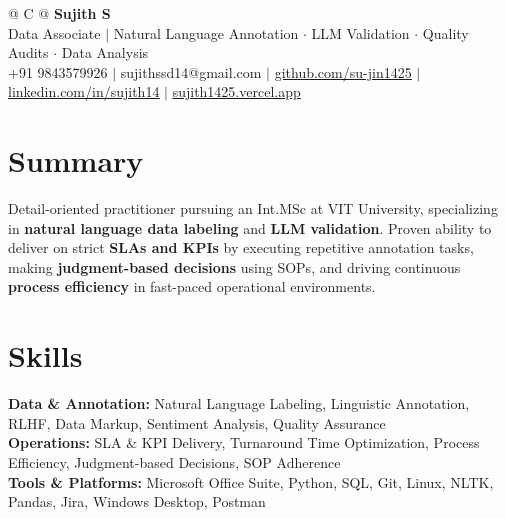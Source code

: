 \documentclass[a4paper,10pt]{article}
\newcommand{\ulink}[2]{\href{#1}{\uline{#2}}}
\begin{document}
\pagestyle{empty}

\begin{tabularx}{\linewidth}{@{} C @{}}
{\color[HTML]{000000}\fontsize{30}{35}\selectfont\bfseries Sujith S} \\[5pt]
{\fontsize{10.5}{12.5}\selectfont\color[HTML]{3A3A3A}
Data Associate $|$ Natural Language Annotation $\cdot$ LLM Validation $\cdot$ Quality Audits $\cdot$ Data Analysis} \\[6pt]
{\fontsize{9.5}{11.5}\selectfont\textcolor[HTML]{3A3A3A}{+91 9843579926 $|$ sujithssd14@gmail.com $|$ \ulink{https://github.com/su-jin1425}{github.com/su-jin1425} $|$ \ulink{https://linkedin.com/in/sujith14}{linkedin.com/in/sujith14} $|$ \ulink{https://sujith1425.vercel.app}{sujith1425.vercel.app}}}
\end{tabularx}

\vspace{2pt}

\section{Summary}
\vspace{3pt}
{\color[HTML]{0A0A0A}\fontsize{11}{14}\selectfont
Detail-oriented practitioner pursuing an Int.MSc at VIT University, specializing in \textbf{natural language data labeling} and \textbf{LLM validation}. Proven ability to deliver on strict \textbf{SLAs and KPIs} by executing repetitive annotation tasks, making \textbf{judgment-based decisions} using SOPs, and driving continuous \textbf{process efficiency} in fast-paced operational environments.}

\vspace{2pt}

\section{Skills}
\vspace{3pt}
{\color[HTML]{0A0A0A}\fontsize{11}{14}\selectfont
\textbf{Data \& Annotation:} Natural Language Labeling, Linguistic Annotation, RLHF, Data Markup, Sentiment Analysis, Quality Assurance \\[2pt]
\textbf{Operations:} SLA \& KPI Delivery, Turnaround Time Optimization, Process Efficiency, Judgment-based Decisions, SOP Adherence \\[2pt]
\textbf{Tools \& Platforms:} Microsoft Office Suite, Python, SQL, Git, Linux, NLTK, Pandas, Jira, Windows Desktop, Postman}
\end{document}
